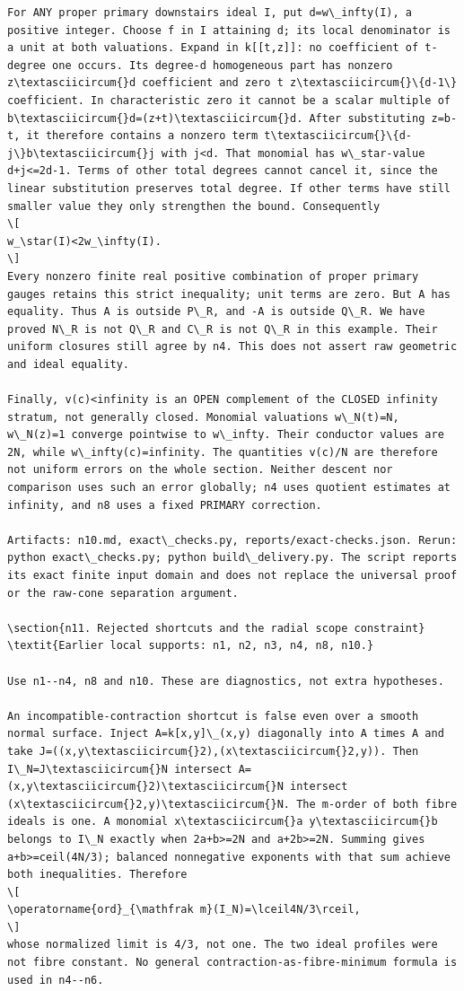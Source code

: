 \documentclass[11pt]{article}
\begin{document}
\begin{Verbatim}[breaklines,fontsize=\tiny]
For ANY proper primary downstairs ideal I, put d=w\_infty(I), a positive integer. Choose f in I attaining d; its local denominator is a unit at both valuations. Expand in k[[t,z]]: no coefficient of t-degree one occurs. Its degree-d homogeneous part has nonzero z\textasciicircum{}d coefficient and zero t z\textasciicircum{}\{d-1\} coefficient. In characteristic zero it cannot be a scalar multiple of b\textasciicircum{}d=(z+t)\textasciicircum{}d. After substituting z=b-t, it therefore contains a nonzero term t\textasciicircum{}\{d-j\}b\textasciicircum{}j with j<d. That monomial has w\_star-value d+j<=2d-1. Terms of other total degrees cannot cancel it, since the linear substitution preserves total degree. If other terms have still smaller value they only strengthen the bound. Consequently
\[
w_\star(I)<2w_\infty(I).
\]
Every nonzero finite real positive combination of proper primary gauges retains this strict inequality; unit terms are zero. But A has equality. Thus A is outside P\_R, and -A is outside Q\_R. We have proved N\_R is not Q\_R and C\_R is not Q\_R in this example. Their uniform closures still agree by n4. This does not assert raw geometric and ideal equality.

Finally, v(c)<infinity is an OPEN complement of the CLOSED infinity stratum, not generally closed. Monomial valuations w\_N(t)=N, w\_N(z)=1 converge pointwise to w\_infty. Their conductor values are 2N, while w\_infty(c)=infinity. The quantities v(c)/N are therefore not uniform errors on the whole section. Neither descent nor comparison uses such an error globally; n4 uses quotient estimates at infinity, and n8 uses a fixed PRIMARY correction.

Artifacts: n10.md, exact\_checks.py, reports/exact-checks.json. Rerun: python exact\_checks.py; python build\_delivery.py. The script reports its exact finite input domain and does not replace the universal proof or the raw-cone separation argument.

\section{n11. Rejected shortcuts and the radial scope constraint}
\textit{Earlier local supports: n1, n2, n3, n4, n8, n10.}

Use n1--n4, n8 and n10. These are diagnostics, not extra hypotheses.

An incompatible-contraction shortcut is false even over a smooth normal surface. Inject A=k[x,y]\_(x,y) diagonally into A times A and take J=((x,y\textasciicircum{}2),(x\textasciicircum{}2,y)). Then I\_N=J\textasciicircum{}N intersect A=(x,y\textasciicircum{}2)\textasciicircum{}N intersect (x\textasciicircum{}2,y)\textasciicircum{}N. The m-order of both fibre ideals is one. A monomial x\textasciicircum{}a y\textasciicircum{}b belongs to I\_N exactly when 2a+b>=2N and a+2b>=2N. Summing gives a+b>=ceil(4N/3); balanced nonnegative exponents with that sum achieve both inequalities. Therefore
\[
\operatorname{ord}_{\mathfrak m}(I_N)=\lceil4N/3\rceil,
\]
whose normalized limit is 4/3, not one. The two ideal profiles were not fibre constant. No general contraction-as-fibre-minimum formula is used in n4--n6.


\end{Verbatim}
\end{document}
